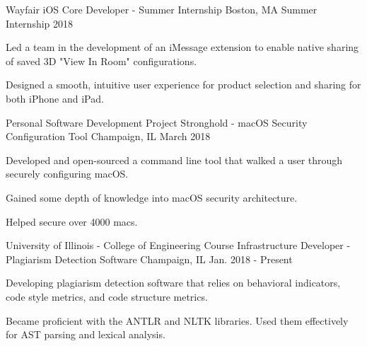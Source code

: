 
\begin{cventries}

  \cventry
{Wayfair} %
{iOS Core Developer - Summer Internship} %
{Boston, MA} %
{Summer Internship 2018} %
{
	\begin{cvitems} %
		\item {Led a team in the development of an iMessage extension to enable native sharing of saved 3D "View In Room" configurations.}
		\item {Designed a smooth, intuitive user experience for product selection and sharing for both iPhone and iPad.}
	\end{cvitems}
}

  \cventry
{Personal Software Development Project} %
{Stronghold - macOS Security Configuration Tool} %
{Champaign, IL} %
{March 2018} %
{
	\begin{cvitems} %
		\item {Developed and open-sourced a command line tool that walked a user through securely configuring macOS.}
		\item{Gained some depth of knowledge into macOS security architecture.} 
		\item {Helped secure over 4000 macs.}
	\end{cvitems}
}
  \cventry
    {University of Illinois - College of Engineering} %
    {Course Infrastructure Developer - Plagiarism Detection Software} %
    {Champaign, IL} %
    {Jan. 2018 - Present} %
    {
      \begin{cvitems} %
        \item {Developing plagiarism detection software that relies on behavioral indicators, code style metrics, and code structure metrics.}
        \item {Became proficient with the ANTLR and NLTK libraries. Used them effectively for AST parsing and lexical analysis.}
      \end{cvitems}
    }


\end{cventries}
